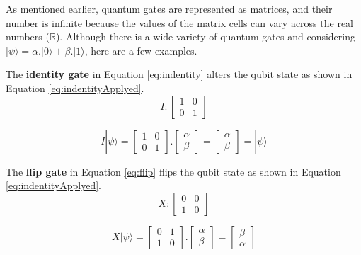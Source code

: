			\par As mentioned earlier, quantum gates are represented as matrices, and their number is infinite because the values of the matrix cells can vary across the real numbers ($\mathbb{R}$). Although there is a wide variety of quantum gates and considering $| \psi \rangle = \alpha . | 0 \rangle + \beta . | 1 \rangle$, here are a few examples.\newline

		
			\par The \textbf{identity gate} in Equation \ref{eq:indentity} alters the qubit state as shown in Equation \ref{eq:indentityApplyed}.
			\begin{equation}
				\label{eq:indentity}
					I : 
					\begin{bmatrix}
						1& 0 \\
						0& 1
					\end{bmatrix}
			\end{equation}

			\begin{equation}
				\label{eq:indentityApplyed}
				I|\psi\rangle = \begin{bmatrix}
					1& 0 \\
					0& 1
				\end{bmatrix} . \begin{bmatrix}
					\alpha \\
					\beta
				\end{bmatrix} = \begin{bmatrix}
					\alpha \\
					\beta
				\end{bmatrix} = |\psi\rangle
			\end{equation}
		
			\par The \textbf{flip gate} in Equation \ref{eq:flip} flips the qubit state as shown in Equation \ref{eq:indentityApplyed}.
			\begin{equation}
				\label{eq:flip}
				X : 
				\begin{bmatrix}
					0& 0 \\
					1& 0
				\end{bmatrix}
			\end{equation}
			
			\begin{equation}
				\label{eq:flipApplyed}
				X|\psi\rangle = \begin{bmatrix}
					0& 1 \\
					1& 0
				\end{bmatrix} . \begin{bmatrix}
					\alpha \\
					\beta
				\end{bmatrix} = \begin{bmatrix}
					\beta \\
					\alpha
				\end{bmatrix}
			\end{equation}
		
